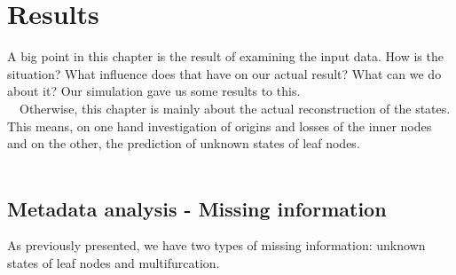 \chapter{Results}
  A big point in this chapter is the result of examining the input data. How is the situation? What 
    influence does that have on our actual result? What can we do about it? Our simulation gave us 
    some results to this. \\
  Otherwise, this chapter is mainly about the actual reconstruction of the states. This means, on 
    one hand investigation of origins and losses of the inner nodes and on the other, the prediction 
    of unknown states of leaf nodes. \\
   
  \section{Metadata analysis - Missing information}
    As previously presented, we have two types of missing information: unknown states of leaf nodes 
      and multifurcation. \\

